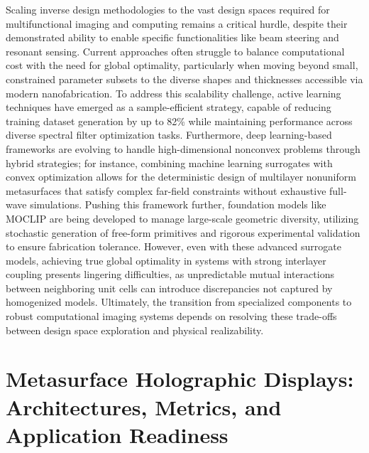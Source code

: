 \documentclass[11pt]{article}
\begin{document}
Scaling inverse design methodologies to the vast design spaces required for multifunctional imaging and computing remains a critical hurdle, despite their demonstrated ability to enable specific functionalities like beam steering and resonant sensing. Current approaches often struggle to balance computational cost with the need for global optimality, particularly when moving beyond small, constrained parameter subsets to the diverse shapes and thicknesses accessible via modern nanofabrication. To address this scalability challenge, active learning techniques have emerged as a sample-efficient strategy, capable of reducing training dataset generation by up to 82\% while maintaining performance across diverse spectral filter optimization tasks. \citep{doi_10_1364_oe_559669_898a2205} Furthermore, deep learning-based frameworks are evolving to handle high-dimensional nonconvex problems through hybrid strategies; for instance, combining machine learning surrogates with convex optimization allows for the deterministic design of multilayer nonuniform metasurfaces that satisfy complex far-field constraints without exhaustive full-wave simulations. Pushing this framework further, foundation models like MOCLIP are being developed to manage large-scale geometric diversity, utilizing stochastic generation of free-form primitives and rigorous experimental validation to ensure fabrication tolerance. However, even with these advanced surrogate models, achieving true global optimality in systems with strong interlayer coupling presents lingering difficulties, as unpredictable mutual interactions between neighboring unit cells can introduce discrepancies not captured by homogenized models. Ultimately, the transition from specialized components to robust computational imaging systems depends on resolving these trade-offs between design space exploration and physical realizability. \citep{doi_10_1364_oe_559669_898a2205} \citep{doi_10_1038_s41467_026_76714_x_8ca5d39b} \citep{doi_10_1109_tap_2021_3137496_d4a1d597}

\section{Metasurface Holographic Displays: Architectures, Metrics, and Application Readiness}\label{metasurface-holographic-displays-architectures-metrics-and-application-readiness}
\end{document}
